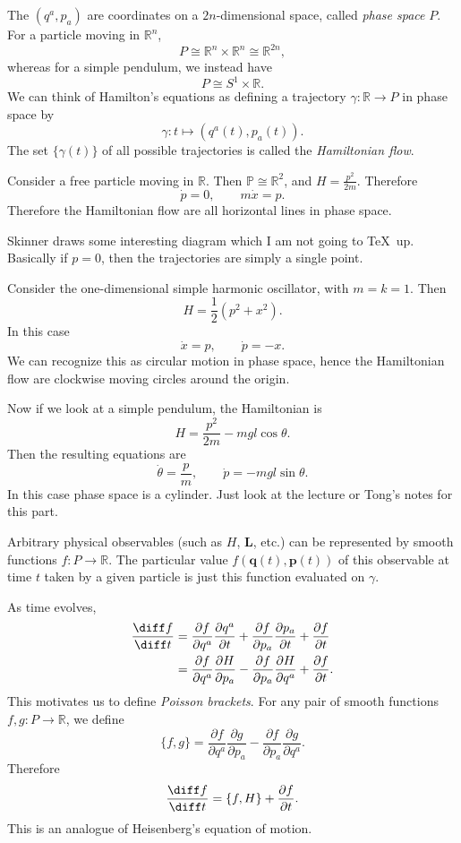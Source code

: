 \documentclass[12pt]{article}
\begin{document}
The $(q^a, p_a)$ are coordinates on a $2n$-dimensional space, called \emph{phase space} $P$. For a particle moving in $\mathbb{R}^{n}$,
\[
P \cong \mathbb{R}^{n} \times \mathbb{R}^{n} \cong \mathbb{R}^{2n},
\]
whereas for a simple pendulum, we instead have
\[
P \cong S^1 \times \mathbb{R}.
\]
We can think of Hamilton's equations as defining a trajectory $\gamma : \mathbb{R} \to P$ in phase space by
\[
\gamma : t \mapsto (q^a(t), p_a(t)).
\]
The set $\{\gamma(t)\}$ of all possible trajectories is called the \emph{Hamiltonian flow}.

\begin{exbox}
	Consider a free particle moving in $\mathbb{R}$. Then $\mathbb{P} \cong \mathbb{R}^2$, and $H = \frac{p^2}{2m}$. Therefore
	\[
	\dot p = 0, \qquad m \dot x = p.
	\]
	Therefore the Hamiltonian flow are all horizontal lines in phase space.

	Skinner draws some interesting diagram which I am not going to \TeX\ up. Basically if $p = 0$, then the trajectories are simply a single point.
\end{exbox}

\begin{exbox}
	Consider the one-dimensional simple harmonic oscillator, with $m = k = 1$. Then
	\[
	H = \frac{1}{2}(p^2 + x^2).
	\]
	In this case 
	\[
	\dot x = p, \qquad \dot p = -x.
	\]
	We can recognize this as circular motion in phase space, hence the Hamiltonian flow are clockwise moving circles around the origin.

	Now if we look at a simple pendulum, the Hamiltonian is
	\[
	H = \frac{p^2}{2m} - mgl \cos \theta.
	\]
	Then the resulting equations are
	\[
	\dot \theta = \frac{p}{m}, \qquad \dot p = -mgl \sin \theta.
	\]
	In this case phase space is a cylinder. Just look at the lecture or Tong's notes for this part.
\end{exbox}

Arbitrary physical observables (such as $H$, $\mathbf{L}$, etc.) can be represented by smooth functions $f : P \to \mathbb{R}$. The particular value $f(\mathbf{q}(t), \mathbf{p}(t))$ of this observable at time $t$ taken by a given particle is just this function evaluated on $\gamma$.

As time evolves,
\begin{align*}
	\frac{\diff f}{\diff t} &= \frac{\partial f}{\partial q^{a}} \frac{\partial q^a}{\partial t} + \frac{\partial f}{\partial p_a} \frac{\partial p_a}{\partial t} + \frac{\partial f}{\partial t} \\
				&= \frac{\partial f}{\partial q^a} \frac{\partial H}{\partial p_a} - \frac{\partial f}{\partial p_a} \frac{\partial H}{\partial q^a} + \frac{\partial f}{\partial t}.
\end{align*}
This motivates us to define \emph{Poisson brackets}. For any pair of smooth functions $f, g : P \to \mathbb{R}$, we define
\[
	\{ f, g\} = \frac{\partial f}{\partial q^a} \frac{\partial g}{\partial p_a} - \frac{\partial f}{\partial p_a} \frac{\partial g}{\partial q^a}.
\]
Therefore
\[
	\frac{\diff f}{\diff t} = \{f, H\} + \frac{\partial f}{\partial t}.
\]
This is an analogue of Heisenberg's equation of motion.
\end{document}
